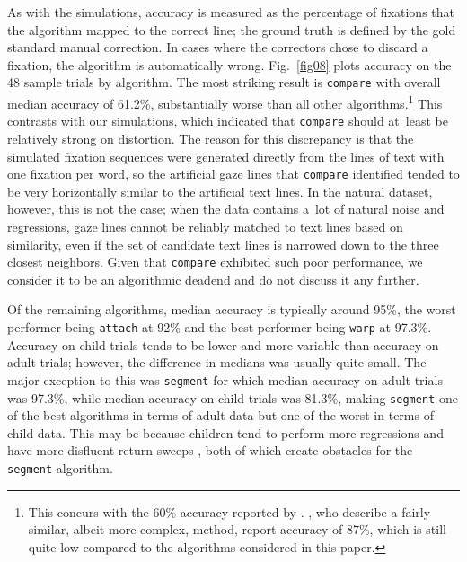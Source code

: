 \documentclass[doc,biblatex]{apa7}
\begin{document}
As with the simulations, accuracy is measured as the percentage of fixations that the algorithm mapped to the correct line; the ground truth is defined by the gold standard manual correction. In cases where the correctors chose to discard a fixation, the algorithm is automatically wrong. Fig.~\ref{fig08} plots accuracy on the 48 sample trials by algorithm. The most striking result is \texttt{compare} with overall median accuracy of 61.2\%, substantially worse than all other algorithms.\footnote{This concurs with the 60\% accuracy reported by \textcite[p.~1231]{LimaSanches:2015}. \textcite[p.~104]{Yamaya:2017}, who describe a fairly similar, albeit more complex, method, report accuracy of 87\%, which is still quite low compared to the algorithms considered in this paper.} This contrasts with our simulations, which indicated that \texttt{compare} should at~least be relatively strong on distortion. The reason for this discrepancy is that the simulated fixation sequences were generated directly from the lines of text with one fixation per word, so the artificial gaze lines that \texttt{compare} identified tended to be very horizontally similar to the artificial text lines. In the natural dataset, however, this is not the case; when the data contains a~lot of natural noise and regressions, gaze lines cannot be reliably matched to text lines based on similarity, even if the set of candidate text lines is narrowed down to the three closest neighbors. Given that \texttt{compare} exhibited such poor performance, we consider it to be an algorithmic deadend and do not discuss it any further.

Of the remaining algorithms, median accuracy is typically around 95\%, the worst performer being \texttt{attach} at 92\% and the best performer being \texttt{warp} at 97.3\%. Accuracy on child trials tends to be lower and more variable than accuracy on adult trials; however, the difference in medians was usually quite small. The major exception to this was \texttt{segment} for which median accuracy on adult trials was 97.3\%, while median accuracy on child trials was 81.3\%, making \texttt{segment} one of the best algorithms in terms of adult data but one of the worst in terms of child data. This may be because children tend to perform more regressions \parencite[e.g.,][]{BlytheJoseph:2011} and have more disfluent return sweeps \parencite[e.g.,][]{Parker:2019}, both of which create obstacles for the \texttt{segment} algorithm.
\end{document}
